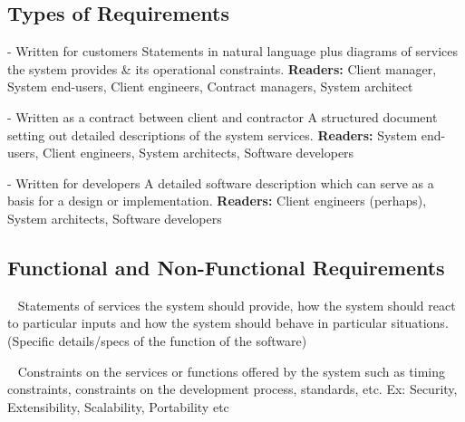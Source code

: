 \documentclass{report}
\begin{document}
\subsection{Types of Requirements}
\begin{description}
  \setlength\itemsep{-.25em}
  \item [User requirements] - Written for customers\newline
  Statements in natural language plus diagrams of services the system provides \& its operational constraints.\newline
  \textbf{Readers:} Client manager, System end-users, Client engineers, Contract managers, System architect
  \item [System requirements] - Written as a contract between client and contractor \newline
  A structured document setting out detailed descriptions of the system services.\newline
  \textbf{Readers:} System end-users, Client engineers, System architects, Software developers
  \item [Software specification] - Written for developers \newline
  A detailed software description which can serve as a basis for a design or implementation. \newline
  \textbf{Readers:} Client engineers (perhaps), System architects, Software developers
\end{description}

\subsection{Functional and Non-Functional Requirements}
\begin{description}
  \setlength\itemsep{-.25em}
  \item [Functional requirements] \ \newline
   Statements of services the system should provide, how the system should react to particular inputs and how the system should behave in particular situations. (Specific details/specs of the function of the software)
  \item [Non-Functional requirements] \ \newline
   Constraints on the services or functions offered by the system such as timing constraints, constraints on the development process, standards, etc. Ex: Security, Extensibility, Scalability, Portability etc
\end{description}
\end{document}
